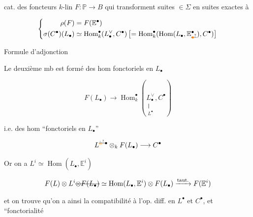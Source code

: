 
cat. des foncteurs $k$-lin $F:\mathbb P\longrightarrow B$ qui transforment suites $\in\Sigma$ en suites exactes à 

\[
 \left\{\begin{aligned}
 \rho(F)&=F(\mathbb E^{\bullet})\\
 \sigma(C^{\bullet})(L_{\bullet})&\simeq\operatorname{Hom}^{\bullet}_{k}(L_{\bullet}^{\vee},C^{\bullet})\left[=\operatorname{Hom}^{\bullet}_{k}(\operatorname{Hom}(L_{\bullet},\mathbb E^{\bullet}_{\deleted{\unsure{\bullet}}}),C^{\bullet})\right]
 \end{aligned}\right.
\]


Formule d'adjonction


Le deuxième mb est formé des hom fonctoriels en $L_{\bullet}$

\[
 F(L_{\bullet})\longrightarrow\operatorname{Hom}^{\bullet}_{k}(\underset{\substack{\Vert\\L^{\bullet}}}{L_{\bullet}^{\vee}},C^{\bullet})
\]

i.e. des hom ``fonctoriels en $L_{\bullet}$''

\[
 L^{\deleted{\unsure{k}}\bullet}\otimes_k F(L_{\bullet})\longrightarrow C^{\bullet}
\]

Or on a $L^i\simeq\operatorname{Hom}(L_{\bullet},\mathbb E^i)$

\[
 F(L)\otimes L^i\deleted{\otimes F(L_{\bullet})}\simeq\operatorname{Hom}(L_{\bullet},\mathbb E^i)\otimes F(L_{\bullet})\xrightarrow{\mathrm{taut.}}F(\mathbb E^i)
\]

et on trouve qu'on a ainsi la  compatibilité à l'op. diff. en $L^{\bullet}$ et $C^{\bullet}$, et ``fonctorialité



